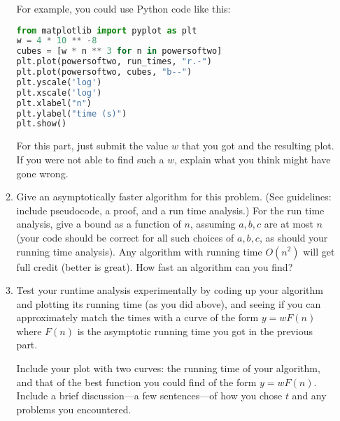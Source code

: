 \documentclass[11pt]{article}
\begin{document}
\begin{enumerate}
\begin{enumerate}
For example, you could use Python code like this: 
\begin{lstlisting}[language=Python]
from matplotlib import pyplot as plt
w = 4 * 10 ** -8
cubes = [w * n ** 3 for n in powersoftwo]
plt.plot(powersoftwo, run_times, "r.-")
plt.plot(powersoftwo, cubes, "b--")
plt.yscale('log')
plt.xscale('log')
plt.xlabel("n")
plt.ylabel("time (s)")
plt.show()
 \end{lstlisting}

	For this part, just submit the value $w$ that you got and the resulting plot. If you were not able to find such a $w$, explain what you think might have gone wrong.  
	
    \item Give an asymptotically faster algorithm for this problem. (See guidelines: include pseudocode, a proof, and a run time analysis.) 
    For the run time analysis, give a bound as a function of $n$, assuming $a,b,c$ are at most $n$ (your code should be correct for all such choices of $a,b,c$, as should your running time analysis). 
    Any algorithm with running time $O(n^2)$ will get full credit (better is great). How fast an algorithm can you find?
    
    \item Test your runtime analysis experimentally by coding up your algorithm and plotting its running time (as you did above), and seeing if you can approximately match the times with a curve of the form $y = w F(n)$ where $F(n)$ is the asymptotic running time you got in the previous part. 
    
    Include your plot with two curves: the running time of your algorithm, and that of the best function you could find of the form $y = w F(n)$. Include a brief discussion—a few sentences—of how you chose $t$ and any problems you encountered.
        \end{enumerate}



\end{enumerate}
	
\end{document}
